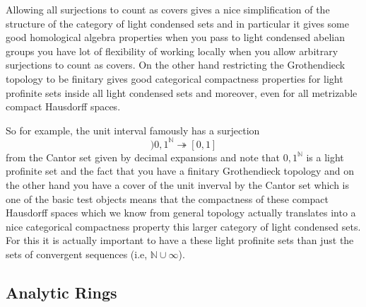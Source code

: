 \begin{remark}
    Allowing all surjections to count as covers gives a nice simplification of the structure of the category of light condensed sets 
    and in particular it gives some good homological algebra properties when you pass to light condensed abelian groups you have lot of 
    flexibility of working locally when you allow arbitrary surjections to count as covers. On the other hand restricting the
   Grothendieck topology to be finitary gives good categorical compactness properties for light profinite sets inside all light condensed sets 
   and moreover, even for all metrizable compact Hausdorff spaces.

   
   So for example, the unit interval famously has a surjection
   $$ {)0,1}^{\mathbb{N}} \twoheadrightarrow [0,1]$$
   from the Cantor set given by decimal expansions and note that ${0,1}^{\mathbb{N}}$ is a light profinite set and the 
   fact that you have a finitary Grothendieck topology and on the other hand you have a cover of the unit inverval by the Cantor set 
   which is one of the basic test objects means that the compactness of these compact Hausdorff spaces which we know from general 
   topology actually translates into a nice categorical compactness property this larger category of light condensed sets. For this it is 
   actually important to have a these light profinite sets than just the sets of convergent sequences (i.e, $\mathbb{N} \cup \infty$). 
\end{remark}


\subsection{Analytic Rings}

